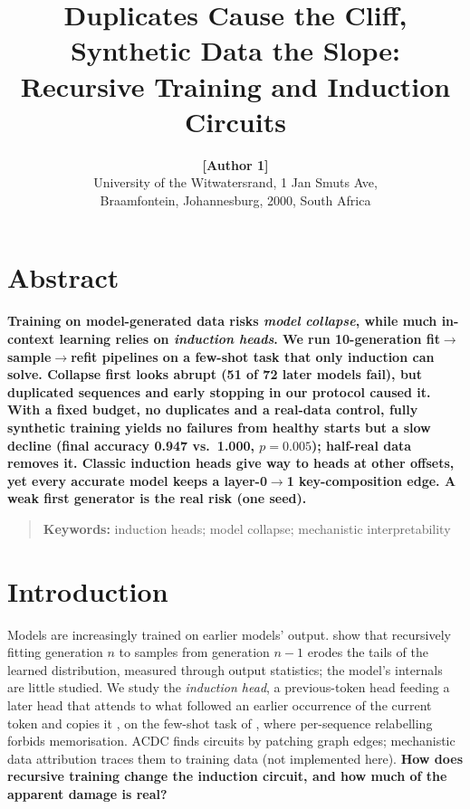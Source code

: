 \documentclass[10pt,letterpaper]{article}
\title{Duplicates Cause the Cliff, Synthetic Data the Slope: Recursive Training and Induction Circuits}
\author{{\large \bf [Author 1]} \\ University of the Witwatersrand, 1 Jan Smuts Ave,\\ Braamfontein, Johannesburg, 2000, South Africa}
\begin{document}
\maketitle

\section{Abstract}
{
\bf
{}
Training on model-generated data risks \emph{model collapse}, while much
in-context learning relies on \emph{induction heads}. We run 10-generation
fit$\to$sample$\to$refit pipelines on a few-shot task that only induction can
solve. Collapse first looks abrupt (51 of 72 later models fail), but duplicated
sequences and early stopping in our protocol caused it. With a fixed budget, no
duplicates and a real-data control, fully synthetic training yields no failures
from healthy starts but a slow decline (final accuracy 0.947 vs.\ 1.000,
$p{=}0.005$); half-real data removes it. Classic induction heads give way to heads
at other offsets, yet every accurate model keeps a layer-0$\to$1 key-composition
edge. A weak first generator is the real risk (one seed).
}
\begin{quote}
\small
\textbf{Keywords:} induction heads; model collapse; mechanistic interpretability
\end{quote}

\section{Introduction} \label{Intro}
Models are increasingly trained on earlier models' output.
\citet{shumailov2023curse,shumailov2024ai} show that recursively fitting
generation $n$ to samples from generation $n{-}1$ erodes the tails of the learned
distribution, measured through output statistics; the model's internals are little
studied. We study the \emph{induction head}, a previous-token head feeding a later
head that attends to what followed an earlier occurrence of the current token and
copies it \citep{olsson2022incontext}, on the few-shot task of
\citet{singh2024needs}, where per-sequence relabelling forbids memorisation. ACDC
\citep{conmy2023towards} finds circuits by patching graph edges; mechanistic data
attribution \citep{chen2026mechanistic} traces them to training data (not
implemented here). \textbf{How does recursive training change the induction
circuit, and how much of the apparent damage is real?}
\end{document}

